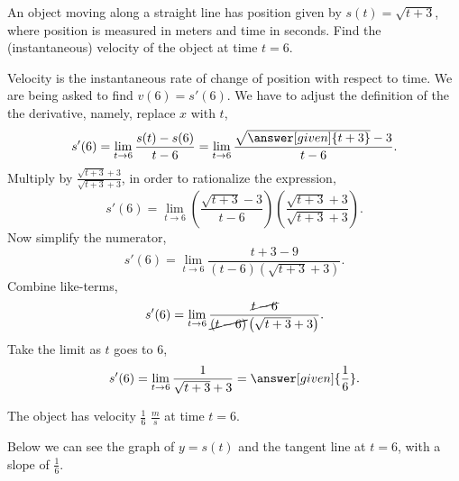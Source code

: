 \documentclass{ximera}
\begin{document}
\begin{example}
\begin{explanation}
\begin{onlineOnly}
\begin{image}
\end{image}

  \end{onlineOnly}
  \end{explanation}
\end{example}
\begin{example}
  An object moving along a straight line has position given by
  $s(t) = \sqrt{t+3}$, where position is measured in meters and time in seconds.  Find the (instantaneous) velocity of the object at time $t=6$.
  \begin{explanation}
    Velocity is the instantaneous rate of change of position with respect to
    time.  We are being asked to find $v(6)=s'(6)$.  We have to adjust the
    definition of the the derivative, namely, replace $x$ with $t$,
    \[
   s'(6) = \lim_{t \to 6} \frac{s(t)-s(6)}{t-6} = \lim_{t\to 6} \frac{\sqrt{\answer[given]{t+3}}-3}{t-6}.
    \]
    Multiply by $\frac{\sqrt{t+3}+3}{\sqrt{t+3}+3}$, in order to rationalize the expression,
    \[
    s'(6) = \lim_{t\to 6} \left(\frac{\sqrt{t+3}-3}{t-6} \right)\left(\frac{\sqrt{t+3}+3}{\sqrt{t+3}+3} \right).
    \]		
    Now simplify the numerator,
    \[
    s'(6) = \lim_{t \to 6} \frac{t+3 - 9}{(t-6)\left(\sqrt{t+3}+3 \right)}.
    \]
    Combine like-terms,
    \[
   s'(6)= \lim_{t \to 6} \frac{\cancel{t-6}}{\cancel{(t-6)}\left(\sqrt{t+3}+3\right)}.
    \]
     Take the limit as $t$ goes to $6$,
    \[
    s'(6)= \lim_{t\to 6} \frac{1}{\sqrt{t+3}+3}=\answer[given]{\frac{1}{6}}.
    \]
  
   
    The object has velocity $\frac{1}{6}$ $\frac{m}{s}$ at time $t=6$.
    
	
	Below we can see the graph of $y=s(t)$ and the tangent line at $t=6$, with a slope of $\frac{1}{6}$. 
	
	 \begin{image}
\end{image}
\end{explanation}
\end{example}
\end{document}

